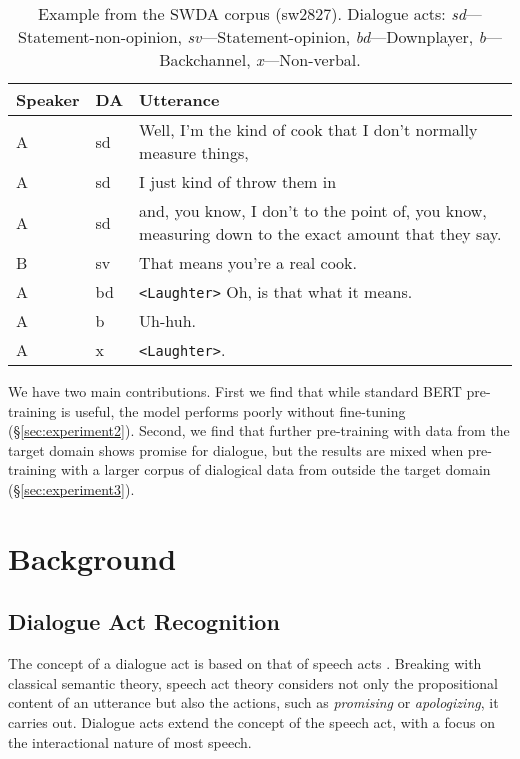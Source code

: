 \documentclass[11pt,a4paper]{article}
\begin{document}
\begin{table}
      \small
  \centering
  \begin{tabularx}{\linewidth}{llL}
    \toprule
    Speaker & DA & Utterance \\ \midrule
    A	&sd	& Well, I'm the kind of cook that I don't normally measure things,  \\
    A	&sd	& I just kind of throw them in \\
    A	&sd	& and, you know, I don't to the point of, you know, measuring down to the exact amount that they say.  \\
    B	&sv	& That means you're a real cook. \\
    A	&bd	& \texttt{<Laughter>} Oh, is that what it means.  \\
    A	&b	& Uh-huh.  \\
    A	&x	& \texttt{<Laughter>}.\\
             \bottomrule
  \end{tabularx}
  \caption{Example from the SWDA corpus (sw2827). Dialogue acts: \emph{sd}---Statement-non-opinion, \emph{sv}---Statement-opinion, \emph{bd}---Downplayer, \emph{b}---Backchannel, \emph{x}---Non-verbal. }
  \label{tab:example}
\end{table}

We have two main contributions.
First we find that while standard BERT pre-training is useful,
the model performs poorly without fine-tuning (\S\ref{sec:experiment2}).
Second, we find that further pre-training with data from the target domain shows promise for dialogue, 
but the results are mixed when pre-training with a larger corpus of dialogical data from outside the target domain (\S\ref{sec:experiment3}).

\section{Background}

\subsection{Dialogue Act Recognition}
The concept of a dialogue act is based on that of speech acts \citep{austinHowThingsWords2009}.
Breaking with classical semantic theory, speech act theory considers not only the propositional content of an utterance but also the actions, such as \emph{promising} or \emph{apologizing}, it carries out.
Dialogue acts extend the concept of the speech act, 
with a focus on the interactional nature of most speech.
\end{document}
